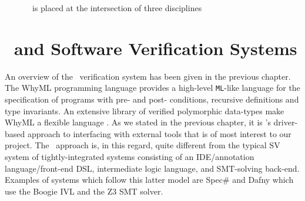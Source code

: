 \begin{figure}

\centering
\def\firstcircle{(3cm,0cm) circle (2.5cm)}
\def\secondcircle{(0cm,0cm) circle (2.5cm)}
\def\thirdcircle{(1.5cm,3cm) circle (2.5cm)}

\caption{\where~is placed at the intersection of three disciplines}
\label{fig:litreview}

\end{figure}


\section{\why~and Software Verification Systems}
\label{sec:lrsv}

An overview of the \why~verification system \cite{why:shephard,why:whereprovers} has been given in the previous chapter. The WhyML programming language provides a high-level \texttt{ML}-like language for the specification of programs with pre- and post- conditions, recursive definitions and type invariants. An extensive library of verified polymorphic data-types make WhyML a flexible language \cite{verifythis,why:polymorphic}. 
As we stated in the previous chapter, it is \why's driver-based approach to interfacing with external tools that is of most interest to our project. 
The \why~approach is, in this regard, quite different from the typical SV system of tightly-integrated systems consisting of an IDE/annotation language/front-end DSL, intermediate logic language, and SMT-solving back-end. 
Examples of systems which follow this latter model are Spec\# \cite{spec} and Dafny \cite{Dafny} which use the Boogie \cite{Boogie} IVL and the Z3 \cite{Z3} SMT solver.

